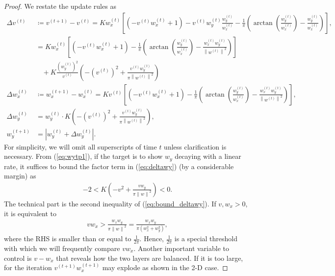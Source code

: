 \documentclass{article}
\theoremstyle{plain}
\theoremstyle{remark}
\newcommand{\norm}[1]{\left\lVert#1\right\rVert}
\def\t{^{(t)}}
\def\tt{^{(t+1)}}
\begin{document}
\begin{proof}
We restate the update rules as
\begin{align}
    \Delta v\t
    &\coloneqq 
    v^{(t+1)} - v^{(t)}
    =
    K w_x\t \left[
    (-v\t w_x\t + 1) - v\t w_y\t\frac{w_y\t}{w_x\t}-\frac{1}{\pi}\left(\arctan{\left(\frac{w_y\t}{w_x\t}\right)}-\frac{w_y\t}{w_x\t}\right)
    \right], \nonumber \\
    &= K w_x\t \left[
    (-v\t w_x\t + 1) - \frac{1}{\pi}\left(\arctan{\left(\frac{w_y\t}{w_x\t}\right)}-\frac{w_x\t w_y\t}{\norm{w\t}^2}\right)
    \right] \nonumber \\
    &~~~~ + K\frac{(w_y\t)^2}{v\t}\left(-(v\t)^2+\frac{v\t w_y\t}{\pi \norm{w\t}^2}\right)
    \label{eq:deltav}\\
    \Delta w_x\t 
    &\coloneqq 
    w_x^{(t+1)} - w_x^{(t)} =
    K v\t\left[
    (-v\t w_x\t + 1) - \frac{1}{\pi}\left(\arctan{\left(\frac{w_y\t}{w_x\t}\right)}-\frac{w_x\t w_y\t}{\norm{w\t}^2}\right)
    \right], \label{eq:deltawx}\\
    \Delta w_y\t
    &=
    w_y^{(t)}\cdot K\left(-(v\t)^2+\frac{v\t w_y\t}{\pi \norm{w\t}^2}\right), \label{eq:deltawy}\\
    w_y\tt &= \left| w_y\t + \Delta w_y\t \right|. \label{eq:wytp1}
\end{align}
For simplicity, we will omit all superscripts of time $t$ unless clarification is necessary. From (\ref{eq:wytp1}), if the target is to show $w_y$ decaying with a linear rate, it suffices to bound the factor term in (\ref{eq:deltawy}) (by a considerable margin) as
\begin{gather}
    -2< K\left(-v^2+\frac{v w_y}{\pi \norm{w}^2}\right) <0. \label{eq:bound_deltawy}
\end{gather}
The technical part is the second inequality of (\ref{eq:bound_deltawy}). If $v, w_x>0$, it is equivalent to 
\begin{align*}
    v w_x>\frac{w_x w_y}{\pi \norm{w}^2}=\frac{w_x w_y}{\pi (w_x^2+w_y^2)},
\end{align*}
where the RHS is smaller than or equal to $\frac{1}{2\pi}$. Hence, $\frac{1}{2\pi}$ is a special threshold with which we will frequently compare $v w_x$. Another important variable to control is $v-w_x$ that reveals how the two layers are balanced. If it is too large, for the iteration $v\tt w_x\tt$ may explode as shown in the 2-D case.


\end{proof}
\end{document}
